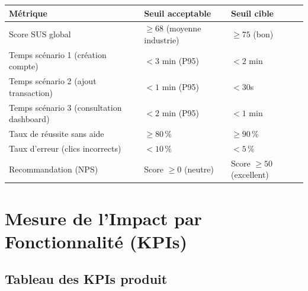 \begin{center}
\begin{tabular}{|p{4.5cm}|p{4cm}|p{5cm}|}
\hline
\textbf{Métrique} & \textbf{Seuil acceptable} & \textbf{Seuil cible} \\
\hline
Score SUS global & $\geq 68$ (moyenne industrie) & $\geq 75$ (bon) \\
\hline
Temps scénario 1 (création compte) & $< 3$ min (P95) & $< 2$ min \\
\hline
Temps scénario 2 (ajout transaction) & $< 1$ min (P95) & $< 30$s \\
\hline
Temps scénario 3 (consultation dashboard) & $< 2$ min (P95) & $< 1$ min \\
\hline
Taux de réussite sans aide & $\geq 80\,\%$ & $\geq 90\,\%$ \\
\hline
Taux d'erreur (clics incorrects) & $< 10\,\%$ & $< 5\,\%$ \\
\hline
Recommandation (NPS) & Score $\geq 0$ (neutre) & Score $\geq 50$ (excellent) \\
\hline
\end{tabular}
\end{center}

\section{Mesure de l'Impact par Fonctionnalité (KPIs)}

\subsection{Tableau des KPIs produit}

